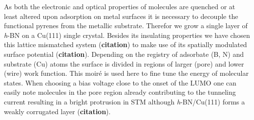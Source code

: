 As both the electronic and optical properties of molecules are quenched or at least altered upon adsorption on metal surfaces it is necessary to decouple the functional pyrenes from the metallic substrate. Therefor we grow a single layer of \textit{h}-BN on a Cu(111) single crystal. Besides its insulating properties we have chosen this lattice mismatched system (\textbf{citation}) to make use of its spatially modulated surface potential (\textbf{citation}). Depending on the registry of adsorbate (B, N) and substrate (Cu) atoms the surface is divided in regions of larger (pore) and lower (wire) work function. This moir\'e is used here to fine tune the energy of molecular states.
When choosing a bias voltage close to the onset of the LUMO one can easily note molecules in the pore region already contributing to the tunneling current resulting in a bright protrusion in STM although \textit{h}-BN/Cu(111) forms a weakly corrugated layer (\textbf{citation}). 

